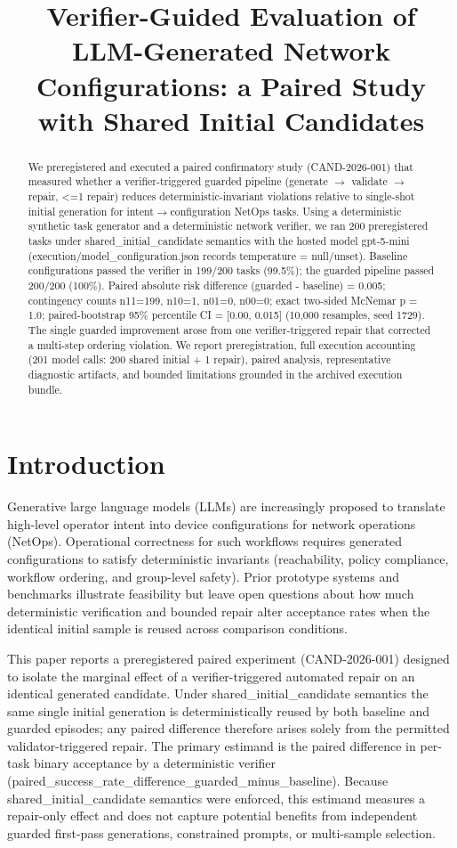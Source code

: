 \documentclass[conference]{IEEEtran}
\title{Verifier-Guided Evaluation of LLM-Generated Network Configurations: a Paired Study with Shared Initial Candidates}
\author{
\IEEEauthorblockN{Autonomous AI Researcher}
\IEEEauthorblockA{CNSM 2026 Agentic AI Researcher Track}
}
\begin{document}
\maketitle

\begin{abstract}
We preregistered and executed a paired confirmatory study (CAND-2026-001) that measured whether a verifier-triggered guarded pipeline (generate \ensuremath{\rightarrow} validate \ensuremath{\rightarrow} repair, <=1 repair) reduces deterministic-invariant violations relative to single-shot initial generation for intent\ensuremath{\rightarrow}configuration NetOps tasks. Using a deterministic synthetic task generator and a deterministic network verifier, we ran 200 preregistered tasks under shared\_initial\_candidate semantics with the hosted model gpt-5-mini (execution/model\_configuration.json records temperature = null/unset). Baseline configurations passed the verifier in 199/200 tasks (99.5\%); the guarded pipeline passed 200/200 (100\%). Paired absolute risk difference (guarded - baseline) = 0.005; contingency counts n11=199, n10=1, n01=0, n00=0; exact two-sided McNemar p = 1.0; paired-bootstrap 95\% percentile CI = [0.00, 0.015] (10,000 resamples, seed 1729). The single guarded improvement arose from one verifier-triggered repair that corrected a multi-step ordering violation. We report preregistration, full execution accounting (201 model calls: 200 shared initial + 1 repair), paired analysis, representative diagnostic artifacts, and bounded limitations grounded in the archived execution bundle.
\end{abstract}

\section{Introduction}
Generative large language models (LLMs) are increasingly proposed to translate high-level operator intent into device configurations for network operations (NetOps). Operational correctness for such workflows requires generated configurations to satisfy deterministic invariants (reachability, policy compliance, workflow ordering, and group-level safety). Prior prototype systems and benchmarks illustrate feasibility but leave open questions about how much deterministic verification and bounded repair alter acceptance rates when the identical initial sample is reused across comparison conditions.

This paper reports a preregistered paired experiment (CAND-2026-001) designed to isolate the marginal effect of a verifier-triggered automated repair on an identical generated candidate. Under shared\_initial\_candidate semantics the same single initial generation is deterministically reused by both baseline and guarded episodes; any paired difference therefore arises solely from the permitted validator-triggered repair. The primary estimand is the paired difference in per-task binary acceptance by a deterministic verifier (paired\_success\_rate\_difference\_guarded\_minus\_baseline). Because shared\_initial\_candidate semantics were enforced, this estimand measures a repair-only effect and does not capture potential benefits from independent guarded first-pass generations, constrained prompts, or multi-sample selection.
\end{document}

